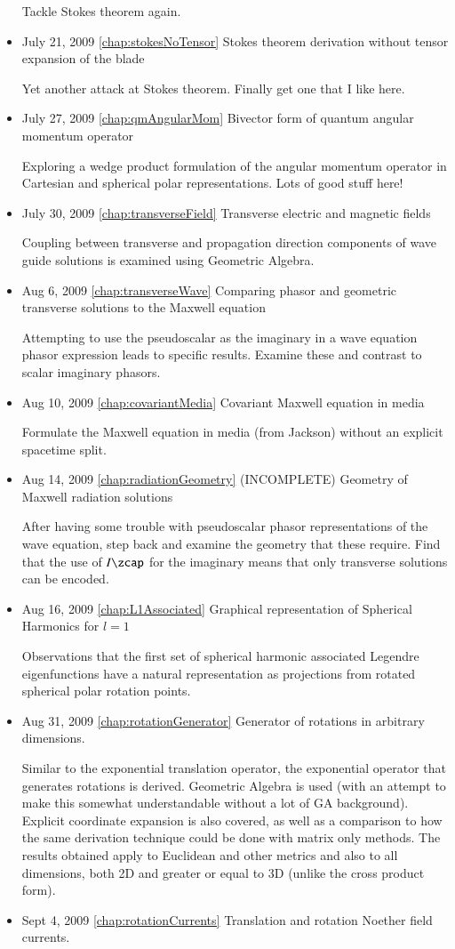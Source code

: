 \begin{itemize}
Tackle Stokes theorem again.\item July 21, 2009 \ref{chap:stokesNoTensor} Stokes theorem derivation without tensor expansion of the blade

Yet another attack at Stokes theorem.  Finally get one that I like here.\item July 27, 2009 \ref{chap:qmAngularMom} Bivector form of quantum angular momentum operator

Exploring a wedge product formulation of the angular momentum operator in Cartesian and spherical polar representations.  Lots of good stuff here!\item July 30, 2009 \ref{chap:transverseField} Transverse electric and magnetic fields

Coupling between transverse and propagation direction components of wave guide solutions is examined using Geometric Algebra.\item Aug 6, 2009 \ref{chap:transverseWave} Comparing phasor and geometric transverse solutions to the Maxwell equation

Attempting to use the pseudoscalar as the imaginary in a wave equation phasor expression leads to specific results.  Examine these and contrast to scalar imaginary phasors.\item Aug 10, 2009 \ref{chap:covariantMedia} Covariant Maxwell equation in media

Formulate the Maxwell equation in media (from Jackson) without an explicit spacetime split.\item Aug 14, 2009 \ref{chap:radiationGeometry} (INCOMPLETE) Geometry of Maxwell radiation solutions

After having some trouble with pseudoscalar phasor representations of the wave equation, step back and examine the geometry that these require.  Find that the use of $I\zcap$ for the imaginary means that only transverse solutions can be encoded.\item Aug 16, 2009 \ref{chap:L1Associated} Graphical representation of Spherical Harmonics for $l=1$

Observations that the first set of spherical harmonic associated Legendre eigenfunctions have a natural representation as projections from rotated spherical polar rotation points.\item Aug 31, 2009 \ref{chap:rotationGenerator} Generator of rotations in arbitrary dimensions.

Similar to the exponential translation operator, the exponential operator that generates rotations is derived.  Geometric Algebra is used (with an attempt to make this somewhat understandable without a lot of GA background).  Explicit coordinate expansion is also covered, as well as a comparison to how the same derivation technique could be done with matrix only methods.  The results obtained apply to Euclidean and other metrics and also to all dimensions, both 2D and greater or equal to 3D (unlike the cross product form).\item Sept 4, 2009 \ref{chap:rotationCurrents} Translation and rotation Noether field currents.


\end{itemize}
